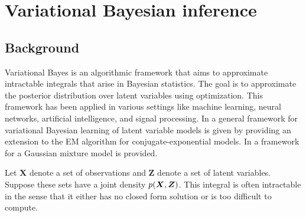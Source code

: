 
\chapter{Variational Bayesian inference}
\section{Background}
Variational Bayes is an algorithmic framework that aims to approximate intractable integrals that arise in Bayesian statistics. The goal is to approximate the posterior distribution over latent variables using optimization. This framework has been applied in various settings like machine learning, neural networks, artificial intelligence, and signal processing. In \cite{beal2003variational} a general framework for variational Bayesian learning of latent variable models is given by providing an extension to the EM algorithm for conjugate-exponential models. In \cite{blei2017variational} a framework for a Gaussian mixture model is provided.

Let ${\bm X}$ denote a set of observations and ${\bm Z}$ denote a set of latent variables. Suppose these sets have a joint density $p \mleft( {\bm X}, {\bm Z} \mright)$. 
This integral is often intractable in the sense that it either has no closed form solution or is too difficult to compute. 

